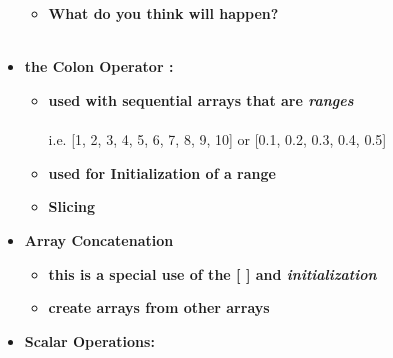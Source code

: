 \documentclass[11pt]{article}
\newcommand{\PR}{\color{mypurple}}
\begin{document}
\begin{itemize}
\begin{itemize}
		  \\\\
		 
		 \item \textbf{ \LARGE What do you think will happen?}\\\\
\end{itemize}
\newpage
		\item \textbf{ \LARGE the \color{mypurple}Colon Operator :\color{black}}\\
	
		\Large
		\begin{itemize}
			\item \textbf{ used with sequential arrays that are {\it ranges}} \\\\ i.e. [1, 2, 3, 4, 5, 6, 7, 8, 9, 10] or [0.1, 0.2, 0.3, 0.4, 0.5] \vspace{25mm} 
			
			\item \textbf{ \Large used for Initialization of a range} \\  \vspace{25mm}
			
			\item \textbf{ \Large Slicing} \\  \vspace{15mm}
		\end{itemize}

\newpage
		\item \textbf{ \LARGE Array  \color{mypurple}Concatenation \color{black} }\\
	
		\Large
		\begin{itemize}
			
			\item \textbf{ \Large this is a special use of the \color{mypurple}[ ] \color{black} and {\it initialization}} \\  \vspace{25mm}
			
			\item \textbf{ \Large create arrays from other arrays} \\  \vspace{15mm}
		\end{itemize}

\newpage		
\item \textbf{ \LARGE {\PR Scalar} Operations:}\\
	

\end{itemize}
\end{document}
